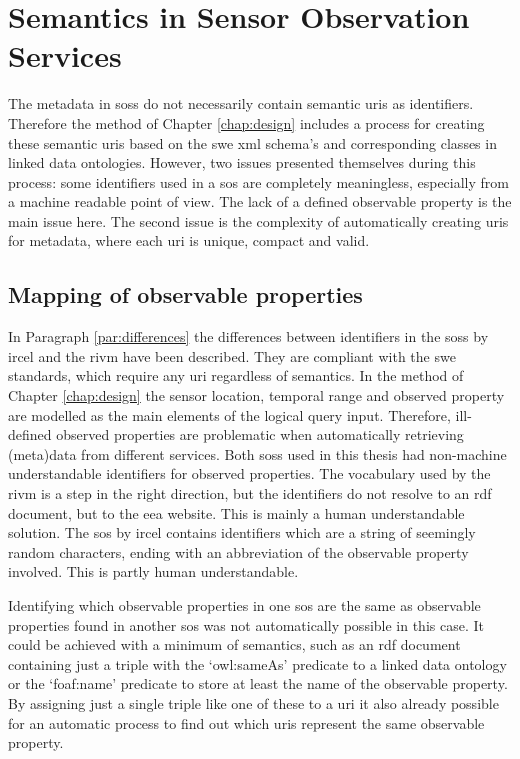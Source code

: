 \section{Semantics in Sensor Observation Services}
The metadata in \aclp{sos} do not necessarily contain semantic \acp{uri} as identifiers. Therefore the method of Chapter \ref{chap:design} includes a process for creating these semantic \acp{uri} based on the \ac{swe} \ac{xml} schema's and corresponding classes in linked data ontologies. However, two issues presented themselves during this process: some identifiers used in a \ac{sos} are completely meaningless, especially from a machine readable point of view. The lack of a defined observable property is the main issue here. The second issue is the complexity of automatically creating \acp{uri} for metadata, where each \ac{uri} is unique, compact and valid.  

\subsection{Mapping of observable properties}
In Paragraph \ref{par:differences} the differences between identifiers in the \aclp{sos} by \ac{ircel} and the \ac{rivm} have been described. They are compliant with the \ac{swe} standards, which require any \ac{uri} regardless of semantics. In the method of Chapter \ref{chap:design} the sensor location, temporal range and observed property are modelled as the main elements of the logical query input. Therefore, ill-defined observed properties are problematic when automatically retrieving (meta)data from different services. Both \aclp{sos} used in this thesis had non-machine understandable identifiers for observed properties. The vocabulary used by the \ac{rivm} is a step in the right direction, but the identifiers do not resolve to an \ac{rdf} document, but to the \ac{eea} website. This is mainly a human understandable solution. The \ac{sos} by \ac{ircel} contains identifiers which are a string of seemingly random characters, ending with an abbreviation of the observable property involved. This is partly human understandable.   

Identifying which observable properties in one \ac{sos} are the same as observable properties found in another \ac{sos} was not automatically possible in this case. It could be achieved with a minimum of semantics, such as an \ac{rdf} document containing just a triple with the `owl:sameAs' predicate to a linked data ontology or the `foaf:name' predicate to store at least the name of the observable property. By assigning just a single triple like one of these to a \ac{uri} it also already possible for an automatic process to find out which \acp{uri} represent the same observable property. 


